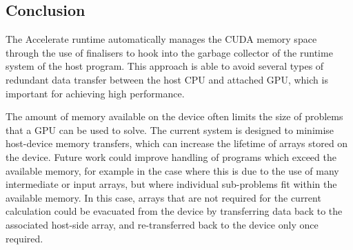 
\subsection{Conclusion}
\label{sec:memory_management_conclusion}

The Accelerate runtime automatically manages the CUDA memory space through the
use of finalisers to hook into the garbage collector of the runtime system of
the host program. This approach is able to avoid several types of redundant data
transfer between the host CPU and attached GPU, which is important for
achieving high performance.

The amount of memory available on the device often limits the size of problems
that a GPU can be used to solve. The current system is designed to minimise
host-device memory transfers, which can increase the lifetime of arrays stored
on the device. Future work could improve handling of programs which exceed the
available memory, for example in the case where this is due to the use of many
intermediate or input arrays, but where individual sub-problems fit within the
available memory. In this case, arrays that are not required for the current
calculation could be evacuated from the device by transferring data back to the
associated host-side array, and re-transferred back to the device only once
required.

